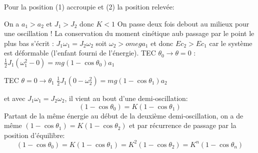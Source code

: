 \begin{Answer}

  Pour la position (1) accroupie et (2) la position relevée:
  \begin{center}
  \end{center}

	\Question On a $a_1 > a_2$ et $J_1 >J_2 $ donc $K< 1$
	On passe deux fois debout au milieux pour une oscillation !
	\Question La conservation du moment cinétique aub passage par le point le plus bas s'écrit : $J_1 \omega_1 = J_2 \omega_2$ soit $\omega_2 > omega_1$ et donc $Ec_2 > Ec_1 $ car le système est déformable (l'enfant fourni de l'énergie).
	\Question TEC $\theta_0 \to \theta =0 $ : $\frac{1}{2}J_1 (\omega_1^2-0) = mg (1-\cos\theta_0) a_1$

	TEC $\theta=0 \to \theta_1$ $\frac{1}{2}J_1 (0-\omega_2^2) = mg (1-\cos\theta_1) a_2$

	et avec $J_1\omega_1 = J_2\omega_2$, il vient au bout d'une demi-oscillation:
	\[ (1-\cos\theta_0) = K (1-\cos\theta_1) \]
	Partant de la même énergie au début de la deuxième demi-oscillation, on a de même $ (1-\cos\theta_1) = K (1-\cos\theta_2)$ et par récurrence de passage par la position d'équilibre:
	\[ (1-\cos\theta_0) = K (1-\cos\theta_1)= K^2 (1-\cos\theta_2)=K^n(1-\cos\theta_n) \]
\end{Answer}

